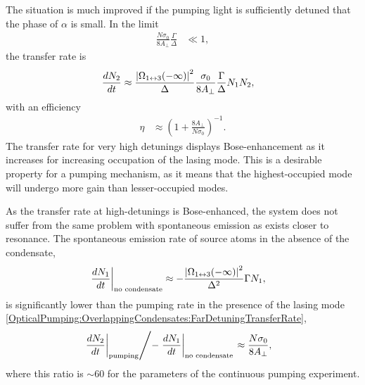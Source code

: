 The situation is much improved if the pumping light is sufficiently detuned that the phase of $\alpha$ is small.  In the limit
\begin{align}
    \frac{N \sigma_0}{8 A_\perp} \frac{\Gamma}{\Delta} &\ll 1,
\end{align}
the transfer rate is
\begin{align}
    \frac{d N_2}{dt} &\approx \frac{\abs{\Omega_{1\leftrightarrow 3}(-\infty)}^2}{\Delta} \frac{\sigma_0}{8 A_\perp} \frac{\Gamma}{\Delta} N_1 N_2, \label{OpticalPumping:OverlappingCondensates:FarDetuningTransferRate}
\end{align}
with an efficiency
\begin{align}
    \eta &\approx \left(1 + \frac{8 A_\perp}{N \sigma_0}\right)^{-1}.
\end{align}
The transfer rate for very high detunings displays Bose-enhancement as it increases for increasing occupation of the lasing mode.  This is a desirable property for a pumping mechanism, as it means that the highest-occupied mode will undergo more gain than lesser-occupied modes.  

As the transfer rate at high-detunings is Bose-enhanced, the system does not suffer from the same problem with spontaneous emission as exists closer to resonance.  The spontaneous emission rate of source atoms in the absence of the condensate,
\begin{align}
    \left. \frac{d N_1}{dt} \right|_\text{no condensate} &\approx - \frac{\left|\Omega_{1\leftrightarrow 3}(-\infty)\right|^2}{\Delta^2}\Gamma N_1,
\end{align}
is significantly lower than the pumping rate in the presence of the lasing mode \eqref{OpticalPumping:OverlappingCondensates:FarDetuningTransferRate},
\begin{align}
    \left. \left. \frac{d N_2}{dt} \right|_\text{pumping} \middle / - \left. \frac{d N_1}{dt} \right|_\text{no condensate} \right. &\approx \frac{N \sigma_0}{8 A_\perp},
\end{align}
where this ratio is $\sim 60$ for the parameters of the continuous pumping experiment.

